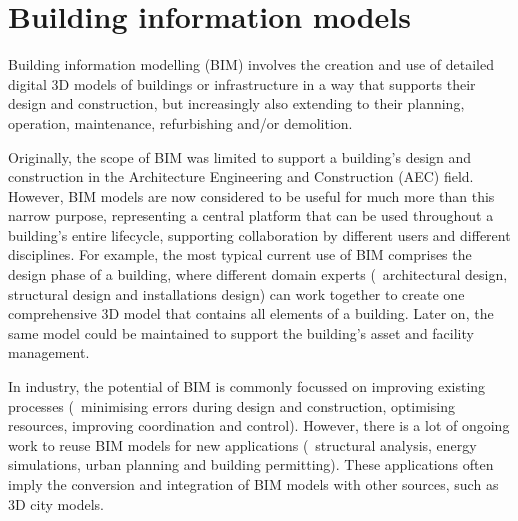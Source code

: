 
\setchapterpreamble[u]{\margintoc}

\graphicspath{{bim/}}

\chapter{Building information models}%
\label{chap:bim}

Building information modelling (BIM) involves the creation and use of detailed digital 3D models of buildings or infrastructure in a way that supports their design and construction, but increasingly also extending to their planning, operation, maintenance, refurbishing and/or demolition.

Originally, the scope of BIM was limited to support a building's design and construction in the Architecture Engineering and Construction (AEC) field.
However, BIM models are now considered to be useful for much more than this narrow purpose, representing a central platform that can be used throughout a building's entire lifecycle, supporting collaboration by different users and different disciplines.
For example, the most typical current use of BIM comprises the design phase of a building, where different domain experts (\eg\ architectural design, structural design and installations design) can work together to create one comprehensive 3D model that contains all elements of a building.
Later on, the same model could be maintained to support the building's asset and facility management.

In industry, the potential of BIM is commonly focussed on improving existing processes (\eg\ minimising errors during design and construction, optimising resources, improving coordination and control).
However, there is a lot of ongoing work to reuse BIM models for new applications (\eg\ structural analysis, energy simulations, urban planning and building permitting).
These applications often imply the conversion and integration of BIM models with other sources, such as 3D city models.



